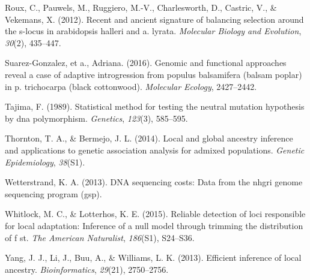 \documentclass[12pt,a4paper,twoside]{ugathesis}
\theoremstyle{definition}
\theoremstyle{definition}
\theoremstyle{remark}
\begin{document}
\hypertarget{ref-roux2012recent}{}
Roux, C., Pauwels, M., Ruggiero, M.-V., Charlesworth, D., Castric, V.,
\& Vekemans, X. (2012). Recent and ancient signature of balancing
selection around the s-locus in arabidopsis halleri and a. lyrata.
\emph{Molecular Biology and Evolution}, \emph{30}(2), 435--447.

\hypertarget{ref-suarez2016}{}
Suarez-Gonzalez, et a., Adriana. (2016). Genomic and functional
approaches reveal a case of adaptive introgression from populus
balsamifera (balsam poplar) in p. trichocarpa (black cottonwood).
\emph{Molecular Ecology}, 2427--2442.

\hypertarget{ref-tajima1989statistical}{}
Tajima, F. (1989). Statistical method for testing the neutral mutation
hypothesis by dna polymorphism. \emph{Genetics}, \emph{123}(3),
585--595.

\hypertarget{ref-thornton2014local}{}
Thornton, T. A., \& Bermejo, J. L. (2014). Local and global ancestry
inference and applications to genetic association analysis for admixed
populations. \emph{Genetic Epidemiology}, \emph{38}(S1).

\hypertarget{ref-wetterstrand2013dna}{}
Wetterstrand, K. A. (2013). DNA sequencing costs: Data from the nhgri
genome sequencing program (gsp).

\hypertarget{ref-whitlock2015reliable}{}
Whitlock, M. C., \& Lotterhos, K. E. (2015). Reliable detection of loci
responsible for local adaptation: Inference of a null model through
trimming the distribution of f st. \emph{The American Naturalist},
\emph{186}(S1), S24--S36.

\hypertarget{ref-yang2013efficient}{}
Yang, J. J., Li, J., Buu, A., \& Williams, L. K. (2013). Efficient
inference of local ancestry. \emph{Bioinformatics}, \emph{29}(21),
2750--2756.


\end{document}
